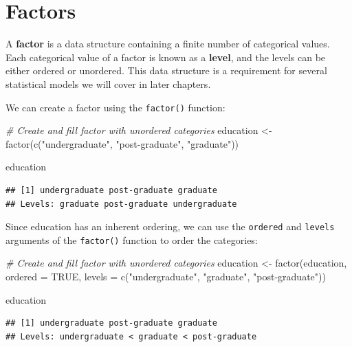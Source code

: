 \documentclass[
]{book}
\newenvironment{Shaded}{\begin{snugshade}}{\end{snugshade}}
\newcommand{\AttributeTok}[1]{\textcolor[rgb]{0.77,0.63,0.00}{#1}}
\newcommand{\CommentTok}[1]{\textcolor[rgb]{0.56,0.35,0.01}{\textit{#1}}}
\newcommand{\ConstantTok}[1]{\textcolor[rgb]{0.00,0.00,0.00}{#1}}
\newcommand{\FunctionTok}[1]{\textcolor[rgb]{0.00,0.00,0.00}{#1}}
\newcommand{\NormalTok}[1]{#1}
\newcommand{\OtherTok}[1]{\textcolor[rgb]{0.56,0.35,0.01}{#1}}
\newcommand{\StringTok}[1]{\textcolor[rgb]{0.31,0.60,0.02}{#1}}
\begin{document}
\hypertarget{factors}{%
\section{Factors}\label{factors}}

A \textbf{factor} is a data structure containing a finite number of categorical values. Each categorical value of a factor is known as a \textbf{level}, and the levels can be either ordered or unordered. This data structure is a requirement for several statistical models we will cover in later chapters.

We can create a factor using the \texttt{factor()} function:

\begin{Shaded}
\begin{Highlighting}[]
\CommentTok{\# Create and fill factor with unordered categories}
\NormalTok{education }\OtherTok{\textless{}{-}} \FunctionTok{factor}\NormalTok{(}\FunctionTok{c}\NormalTok{(}\StringTok{"undergraduate"}\NormalTok{, }\StringTok{"post{-}graduate"}\NormalTok{, }\StringTok{"graduate"}\NormalTok{))}

\NormalTok{education}
\end{Highlighting}
\end{Shaded}

\begin{verbatim}
## [1] undergraduate post-graduate graduate     
## Levels: graduate post-graduate undergraduate
\end{verbatim}

Since education has an inherent ordering, we can use the \texttt{ordered} and \texttt{levels} arguments of the \texttt{factor()} function to order the categories:

\begin{Shaded}
\begin{Highlighting}[]
\CommentTok{\# Create and fill factor with unordered categories}
\NormalTok{education }\OtherTok{\textless{}{-}} \FunctionTok{factor}\NormalTok{(education, }\AttributeTok{ordered =} \ConstantTok{TRUE}\NormalTok{, }\AttributeTok{levels =} \FunctionTok{c}\NormalTok{(}\StringTok{"undergraduate"}\NormalTok{, }\StringTok{"graduate"}\NormalTok{, }\StringTok{"post{-}graduate"}\NormalTok{))}

\NormalTok{education}
\end{Highlighting}
\end{Shaded}

\begin{verbatim}
## [1] undergraduate post-graduate graduate     
## Levels: undergraduate < graduate < post-graduate
\end{verbatim}
\end{document}
